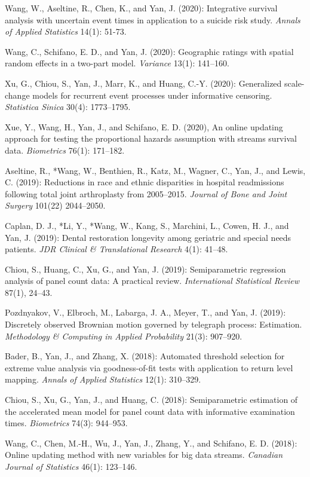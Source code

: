 \documentclass[Statistics]{vita}
\begin{document}
\begin{vita}
\begin{Publications}
\begin{RefereedJournalArticles}
  \item *Wang, W., Aseltine, R., Chen, K., and Yan, J. (2020): Integrative survival analysis with uncertain event times in application to a suicide risk study. {\em Annals of Applied Statistics\/} 14(1): 51-73.      
  \item *Wang, C., Schifano, E. D., and Yan, J. (2020): Geographic ratings with spatial random effects in a two-part model. {\em Variance\/} 13(1): 141--160.
  \item Xu, G., Chiou, S., Yan, J., Marr, K., and Huang, C.-Y. (2020): Generalized scale-change models for recurrent event processes under informative censoring. {\em Statistica Sinica\/} 30(4): 1773--1795.
  \item *Xue, Y., Wang, H., Yan, J., and Schifano, E. D. (2020), An online updating approach for testing the proportional hazards assumption with streams survival data. {\em Biometrics\/} 76(1): 171--182.
  \item Aseltine, R., *Wang, W., Benthien, R., Katz, M., Wagner, C., Yan, J., and Lewis, C. (2019): Reductions in race and ethnic disparities in hospital readmissions following total joint arthroplasty from 2005--2015. {\em Journal of Bone and Joint Surgery\/} 101(22) 2044--2050. 
 \item Caplan, D. J., *Li, Y., *Wang, W., Kang, S., Marchini, L., Cowen, H. J., and Yan, J. (2019): Dental restoration longevity among geriatric and special needs patients. {\em JDR Clinical \& Translational Research\/} 4(1): 41--48.
  \item Chiou, S., Huang, C., Xu, G., and Yan, J. (2019): Semiparametric regression analysis of panel count data: A practical review. {\em International Statistical Review\/} 87(1), 24--43.
  \item Pozdnyakov, V., Elbroch, M., Labarga, J. A., Meyer, T., and Yan, J. (2019): Discretely observed Brownian motion governed by telegraph process: Estimation. {\em Methodology \& Computing in Applied Probability\/} 21(3): 907--920.
  \item *Bader, B., Yan, J., and Zhang, X. (2018): Automated threshold selection for extreme value analysis via goodness-of-fit tests with application to return level mapping. {\em Annals of Applied Statistics\/} 12(1): 310--329.
  \item Chiou, S., Xu, G., Yan, J., and Huang, C. (2018): Semiparametric estimation of the accelerated mean model for panel count data with informative examination times. {\em Biometrics\/} 74(3): 944--953.
  \item *Wang, C., Chen, M.-H., Wu, J., Yan, J., Zhang, Y., and Schifano, E. D. (2018): Online updating method with new variables for big data streams. {\em Canadian Journal of Statistics\/} 46(1): 123--146.

\end{RefereedJournalArticles}
\end{Publications}
\end{vita}
\end{document}
